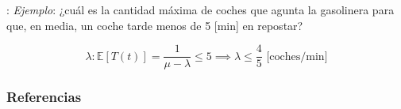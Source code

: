\documentclass{beamer}
\begin{document}
\begin{frame}{\secname: \subsecname}
    \textit{Ejemplo}: ¿cuál es la
    cantidad máxima de coches
    que agunta la gasolinera
    para que, en media, un coche tarde
    menos de 5 [min] en repostar?

    \begin{equation}
        \lambda: \mathbb{E}[T(t)] =
        \frac{1}{\mu-\lambda} \leq 5
        \implies \lambda \leq \frac{4}{5}
        \text{ [coches/min]}
    \end{equation}

    \begin{figure}
        
    \end{figure}

\end{frame}



\begin{frame}[allowframebreaks]
        \frametitle{Referencias}
        
        
\end{frame}
\end{document}
